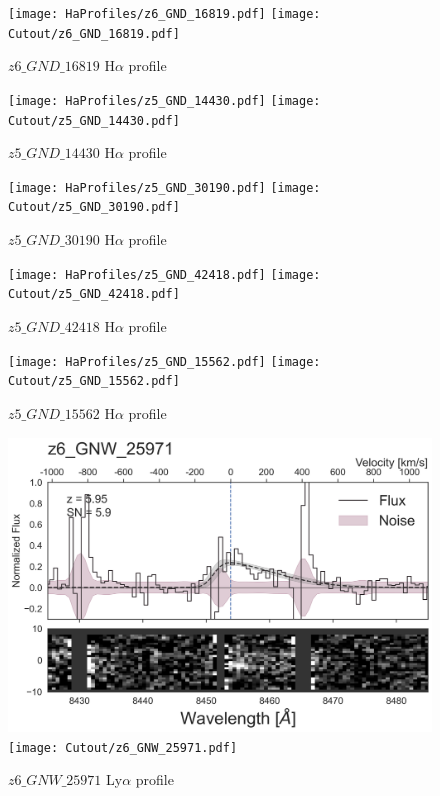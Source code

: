 \documentclass[12pt,english]{article}
\begin{document}
\begin{figure}
\begin{center}\texttt{[image: HaProfiles/z6\_GND\_16819.pdf]}
\texttt{[image: Cutout/z6\_GND\_16819.pdf]}
\caption{$z6\_GND\_16819$ H$\alpha$ profile}
\end{center}
\end{figure}
\clearpage
\begin{figure}
\begin{center}\texttt{[image: HaProfiles/z5\_GND\_14430.pdf]}
\texttt{[image: Cutout/z5\_GND\_14430.pdf]}
\caption{$z5\_GND\_14430$ H$\alpha$ profile}
\end{center}
\end{figure}
\clearpage
\begin{figure}
\begin{center}\texttt{[image: HaProfiles/z5\_GND\_30190.pdf]}
\texttt{[image: Cutout/z5\_GND\_30190.pdf]}
\caption{$z5\_GND\_30190$ H$\alpha$ profile}
\end{center}
\end{figure}
\clearpage
\begin{figure}
\begin{center}\texttt{[image: HaProfiles/z5\_GND\_42418.pdf]}
\texttt{[image: Cutout/z5\_GND\_42418.pdf]}
\caption{$z5\_GND\_42418$ H$\alpha$ profile}
\end{center}
\end{figure}
\clearpage
\begin{figure}
\begin{center}\texttt{[image: HaProfiles/z5\_GND\_15562.pdf]}
\texttt{[image: Cutout/z5\_GND\_15562.pdf]}
\caption{$z5\_GND\_15562$ H$\alpha$ profile}
\end{center}
\end{figure}
\clearpage
\begin{figure}
\begin{center}\includegraphics[width=12cm, trim=0.1cm 0cm 0cm -1cm]{LyaProfiles/z6_GNW_25971.png}
\texttt{[image: Cutout/z6\_GNW\_25971.pdf]}
\caption{$z6\_GNW\_25971$ Ly$\alpha$ profile}
\end{center}
\end{figure}
\end{document}
